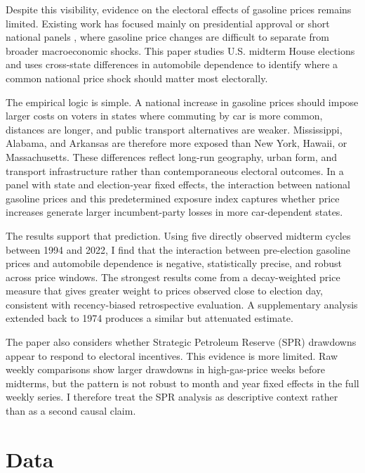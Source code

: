 \documentclass[12pt]{article}
\begin{document}
Despite this visibility, evidence on the electoral effects of gasoline prices remains limited. Existing work has focused mainly on presidential approval or short national panels \citep{Ansolabehere2014, Healy2010}, where gasoline price changes are difficult to separate from broader macroeconomic shocks. This paper studies U.S. midterm House elections and uses cross-state differences in automobile dependence to identify where a common national price shock should matter most electorally.

The empirical logic is simple. A national increase in gasoline prices should impose larger costs on voters in states where commuting by car is more common, distances are longer, and public transport alternatives are weaker. Mississippi, Alabama, and Arkansas are therefore more exposed than New York, Hawaii, or Massachusetts. These differences reflect long-run geography, urban form, and transport infrastructure rather than contemporaneous electoral outcomes. In a panel with state and election-year fixed effects, the interaction between national gasoline prices and this predetermined exposure index captures whether price increases generate larger incumbent-party losses in more car-dependent states.

The results support that prediction. Using five directly observed midterm cycles between 1994 and 2022, I find that the interaction between pre-election gasoline prices and automobile dependence is negative, statistically precise, and robust across price windows. The strongest results come from a decay-weighted price measure that gives greater weight to prices observed close to election day, consistent with recency-biased retrospective evaluation. A supplementary analysis extended back to 1974 produces a similar but attenuated estimate.

The paper also considers whether Strategic Petroleum Reserve (SPR) drawdowns appear to respond to electoral incentives. This evidence is more limited. Raw weekly comparisons show larger drawdowns in high-gas-price weeks before midterms, but the pattern is not robust to month and year fixed effects in the full weekly series. I therefore treat the SPR analysis as descriptive context rather than as a second causal claim.

\section{Data}
\label{sec:data}
\end{document}
